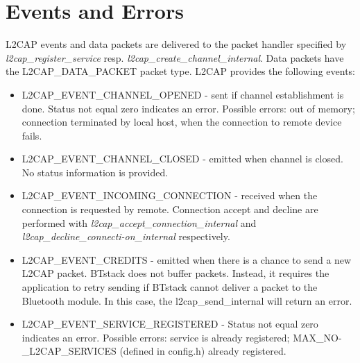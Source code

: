 \section{Events and Errors}
\label{appendix:api_events_and_errors}

L2CAP events and data packets are delivered to the packet handler specified by \emph{l2cap\_register\_service} resp. \emph{l2cap\_create\_channel\_internal}. Data packets have the L2CAP\_DATA\_PACKET packet type. L2CAP provides the following events:
\begin{itemize}
\item L2CAP\_EVENT\_CHANNEL\_OPENED - sent if channel establishment is done. Status not equal zero indicates an error. Possible errors: out of memory; connection terminated by local host, when the connection to remote device fails.
\item L2CAP\_EVENT\_CHANNEL\_CLOSED - emitted when channel is closed. No status information is provided.
\item L2CAP\_EVENT\_INCOMING\_CONNECTION - received when the connection is requested  by remote. Connection accept and decline are performed with \emph{l2cap\_accept\_connection\_internal} and \emph{l2cap\_decline\_connecti-on\_internal} respectively.
\item L2CAP\_EVENT\_CREDITS - emitted when there is a chance to send a new L2CAP packet. BTstack does not buffer packets. Instead, it requires the application to retry sending if BTstack cannot deliver a packet to the Bluetooth module. In this case, the l2cap\_send\_internal will return an error. 
\item L2CAP\_EVENT\_SERVICE\_REGISTERED - Status not equal zero indicates an error. Possible errors: service is already registered; MAX\_NO-\_L2CAP\_SERVICES (defined in config.h) already registered.
\end{itemize}
 
